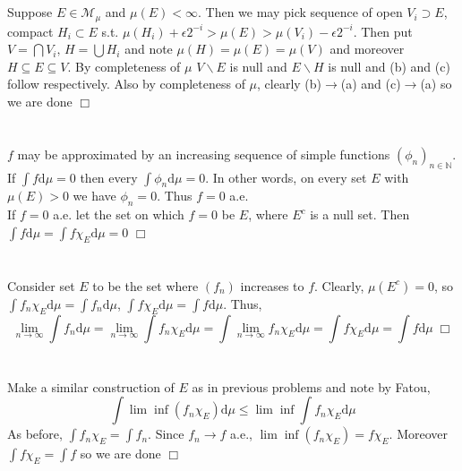 \documentclass{article}
\begin{document}
\section{}
Suppose $E \in \mathcal{M}_\mu$ and $\mu(E) < \infty$. Then we may pick sequence of open $V_i \supset E$, compact $H_i \subset E$ s.t. $\mu(H_i) + \epsilon 2^{-i} > \mu(E) > \mu(V_i) - \epsilon 2^{-i}$. Then put $V = \bigcap V_i,\, H = \bigcup H_i$ and note $\mu(H) = \mu(E) = \mu(V)$ and moreover $H \subseteq E \subseteq V$. By completeness of $\mu$ $V\backslash E$ is null and $E\backslash H$ is null and (b) and (c) follow respectively. Also by completeness of $\mu$, clearly (b)$\rightarrow$(a) and (c)$\rightarrow$(a) so we are done $\Box$

\section{}
$f$ may be approximated by an increasing sequence of simple functions $(\phi_n)_{n\in \mathbb{N}}$. If $\int f \textrm{d}\mu = 0$ then every $\int \phi_n \textrm{d}\mu = 0$. In other words, on every set $E$ with $\mu(E) > 0$ we have $\phi_n = 0$. Thus $f = 0$ a.e.\\
If $f = 0$ a.e. let the set on which $f = 0$ be $E$, where $E^c$ is a null set. Then $\int f \textrm{d}\mu = \int f\chi_E \textrm{d}\mu = 0$ $\Box$

\section{}
Consider set $E$ to be the set where $(f_n)$ increases to $f$. Clearly, $\mu(E^c) = 0$, so $\int f_n\chi_E \textrm{d}\mu = \int f_n \textrm{d}\mu$, $\int f\chi_E \textrm{d}\mu = \int f \textrm{d}\mu$. Thus,
$$\lim\limits_{n\rightarrow\infty} \int f_n \textrm{d}\mu = \lim\limits_{n\rightarrow\infty} \int f_n\chi_E \textrm{d}\mu = \int \lim\limits_{n\rightarrow\infty} f_n\chi_E \textrm{d}\mu = \int f\chi_E \textrm{d}\mu = \int f \textrm{d}\mu \; \Box$$

\section{}
Make a similar construction of $E$ as in previous problems and note by Fatou,
$$\int \lim\inf (f_n\chi_E) \textrm{d}\mu \leq \lim\inf \int f_n\chi_E \textrm{d}\mu$$
As before, $\int f_n\chi_E = \int f_n$. Since $f_n \rightarrow f$ a.e., $\lim\inf(f_n\chi_E) = f\chi_E$. Moreover $\int f\chi_E = \int f$ so we are done $\Box$
\end{document}
